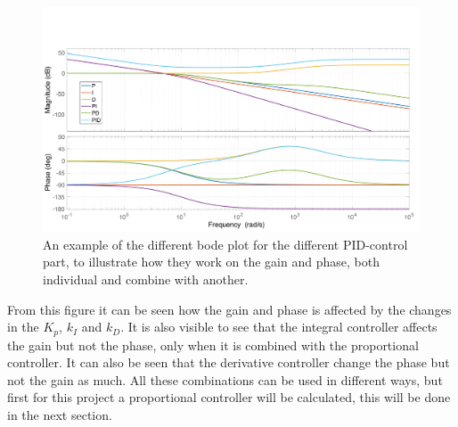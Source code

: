 \begin{figure}[H]
    \centering
    \includegraphics[width=\textwidth]{figures/ch_design/controller/Bodeplot_PID.pdf}
    \caption{An example of the different bode plot for the different PID-control part, to illustrate how they work on the gain and phase, both individual and combine with another.}
    \label{fig:PID_bode}
\end{figure}
From this figure it can be seen how the gain and phase is affected by the changes in the $K_p$, $k_I$ and $k_D$. It is also visible to see that the integral controller affects the gain but not the phase, only when it is combined with the proportional controller. 
It can also be seen that the derivative controller change the phase but not the gain as much. All these combinations can be used in different ways, but first for this project a proportional controller will be calculated, this will be done in the next section.

